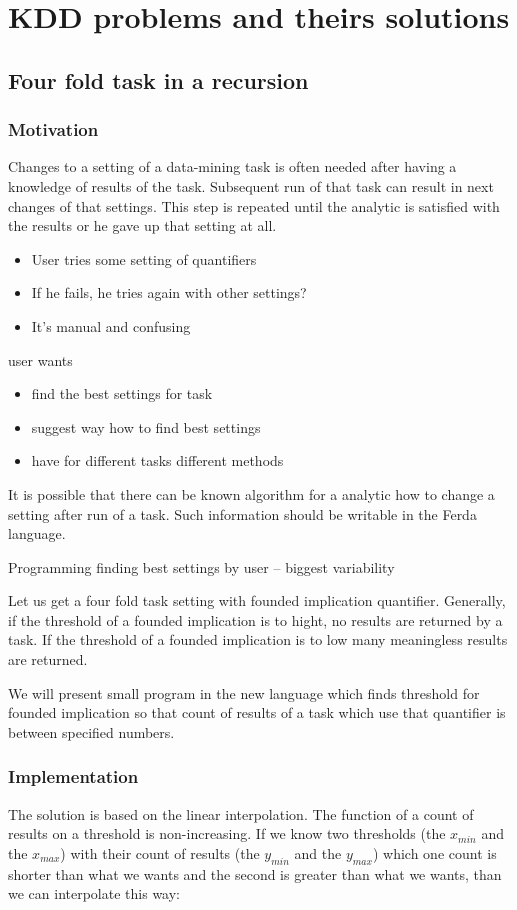 \documentclass[a4paper,12pt]{book}
\begin{document}
\chapter{KDD problems and theirs solutions}
\label{chap:KDDExamples}
\section{Four fold task in a recursion}
\subsection{Motivation}
Changes to a setting of a data-mining task is often needed after having a knowledge of results of the task. Subsequent run of that task can result in next changes of that settings. This step is repeated until the analytic is satisfied with the results or he gave up that setting at all.

\begin{itemize}
			\item User tries some setting of quantifiers
			\item If he fails, he tries again with other settings?
			\item It's manual and confusing
\end{itemize}
		user wants
		\begin{itemize}
			\item find the best settings for task
			\item suggest way how to find best settings
			\item have for different tasks different methods
		\end{itemize}

It is possible that there can be known algorithm for a analytic how to change a setting after run of a task. Such information should be writable in the Ferda language.

Programming finding best settings by user -- biggest variability

Let us get a four fold task setting with founded implication quantifier. Generally, if the threshold of a founded implication is to hight, no results are returned by a task. If the threshold of a founded implication is to low many meaningless results are returned.

We will present small program in the new language which finds threshold for founded implication so that count of results of a task which use that quantifier is between specified numbers.

\subsection{Implementation}
The solution is based on the linear interpolation. The function of a count of results on a threshold is non-increasing. If we know two thresholds (the $x_{min}$ and the $x_{max}$) with their count of results (the $y_{min}$ and the $y_{max}$) which one count is shorter than what we wants and the second is greater than what we wants, than we can interpolate this way: 
\end{document}
